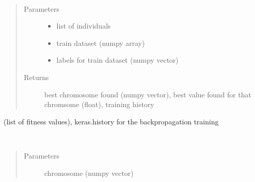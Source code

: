 \documentclass[letterpaper,10pt,english]{sphinxmanual}
\begin{document}
\begin{fulllineitems}
\begin{fulllineitems}
\end{fulllineitems}


\begin{fulllineitems}
\label{\detokenize{index:genetic_optimizer.GeneticNeuralOptimizer.fitness}}~\begin{quote}\begin{description}
\item[{Parameters}] \leavevmode\begin{itemize}
\item {} 
 \textendash{} list of individuals

\item {} 
 \textendash{} train dataset (numpy array)

\item {} 
 \textendash{} labels for train dataset (numpy vector)

\end{itemize}

\item[{Returns}] \leavevmode
best chromosome found (numpy vector), best value found for that chromsome (float), training history

\end{description}\end{quote}

(list of fitness values), keras.history for the backpropagation training

\end{fulllineitems}


\begin{fulllineitems}
\label{\detokenize{index:genetic_optimizer.GeneticNeuralOptimizer.transform_weights}}~\begin{quote}\begin{description}
\item[{Parameters}] \leavevmode
{} \textendash{} chromosome (numpy vector)


\end{description}
\end{quote}
\end{fulllineitems}
\end{fulllineitems}
\end{document}
